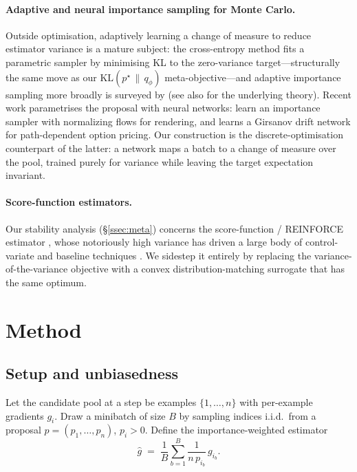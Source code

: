 \documentclass[11pt]{article}
\begin{document}
\paragraph{Adaptive and neural importance sampling for Monte Carlo.}
Outside optimisation, adaptively learning a change of measure to reduce
estimator variance is a mature subject: the cross-entropy method
\citep{rubinstein2004} fits a parametric sampler by minimising KL to the
zero-variance target---structurally the same move as our $\mathrm{KL}(p^\star\,\|\,
q_\phi)$ meta-objective---and adaptive importance sampling more broadly is
surveyed by \citet{bugallo2017} (see also \citet{owen2013} for the underlying
theory). Recent work parametrises the proposal with neural networks:
\citet{mueller2019} learn an importance sampler with normalizing flows for
rendering, and \citet{virrion2020} learns a Girsanov drift network for
path-dependent option pricing. Our construction is the discrete-optimisation
counterpart of the latter: a network maps a batch to a change of measure over the
pool, trained purely for variance while leaving the target expectation invariant.

\paragraph{Score-function estimators.}
Our stability analysis (\S\ref{ssec:meta}) concerns the score-function /
REINFORCE estimator \citep{williams1992}, whose notoriously high variance has
driven a large body of control-variate and baseline techniques
\citep{mnih2014}. We sidestep it entirely by replacing the
variance-of-the-variance objective with a convex distribution-matching surrogate
that has the same optimum.

\section{Method}

\subsection{Setup and unbiasedness}
Let the candidate pool at a step be examples $\{1,\dots,n\}$ with per-example
gradients $g_i$. Draw a minibatch of size $B$ by sampling indices i.i.d.\ from a
proposal $p=(p_1,\dots,p_n)$, $p_i>0$. Define the importance-weighted estimator
\begin{equation}
\hat g \;=\; \frac{1}{B}\sum_{b=1}^{B} \frac{1}{n\,p_{i_b}}\, g_{i_b}.
\label{eq:est}
\end{equation}
\end{document}
